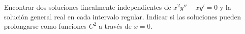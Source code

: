 Encontrar dos soluciones linealmente independientes de
\(x^2y''-xy'=0\) y la solución general real en cada intervalo regular.
Indicar si las soluciones pueden prolongarse como funciones \(C^2\) a través de \(x=0\).
